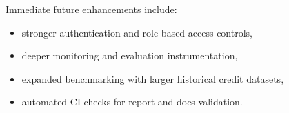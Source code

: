 \documentclass[12pt,a4paper]{article}
\begin{document}
Immediate future enhancements include:
\begin{itemize}
    \item stronger authentication and role-based access controls,
    \item deeper monitoring and evaluation instrumentation,
    \item expanded benchmarking with larger historical credit datasets,
    \item automated CI checks for report and docs validation.
\end{itemize}
\end{document}
